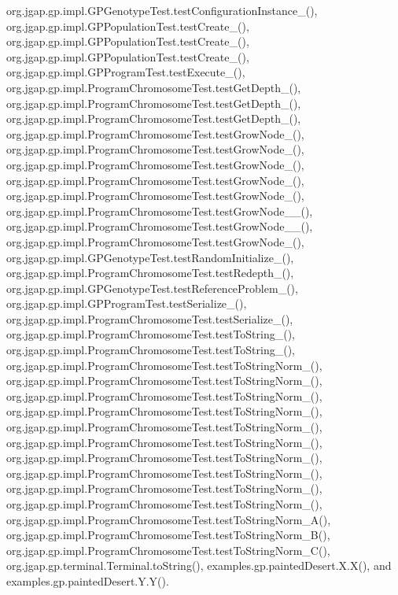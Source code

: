 org.\-jgap.\-gp.\-impl.\-G\-P\-Genotype\-Test.\-test\-Configuration\-Instance\-\_(), org.\-jgap.\-gp.\-impl.\-G\-P\-Population\-Test.\-test\-Create\-\_(), org.\-jgap.\-gp.\-impl.\-G\-P\-Population\-Test.\-test\-Create\-\_(), org.\-jgap.\-gp.\-impl.\-G\-P\-Population\-Test.\-test\-Create\-\_(), org.\-jgap.\-gp.\-impl.\-G\-P\-Program\-Test.\-test\-Execute\-\_(), org.\-jgap.\-gp.\-impl.\-Program\-Chromosome\-Test.\-test\-Get\-Depth\-\_(), org.\-jgap.\-gp.\-impl.\-Program\-Chromosome\-Test.\-test\-Get\-Depth\-\_(), org.\-jgap.\-gp.\-impl.\-Program\-Chromosome\-Test.\-test\-Get\-Depth\-\_(), org.\-jgap.\-gp.\-impl.\-Program\-Chromosome\-Test.\-test\-Grow\-Node\-\_(), org.\-jgap.\-gp.\-impl.\-Program\-Chromosome\-Test.\-test\-Grow\-Node\-\_(), org.\-jgap.\-gp.\-impl.\-Program\-Chromosome\-Test.\-test\-Grow\-Node\-\_(), org.\-jgap.\-gp.\-impl.\-Program\-Chromosome\-Test.\-test\-Grow\-Node\-\_(), org.\-jgap.\-gp.\-impl.\-Program\-Chromosome\-Test.\-test\-Grow\-Node\-\_(), org.\-jgap.\-gp.\-impl.\-Program\-Chromosome\-Test.\-test\-Grow\-Node\-\_\-\_(), org.\-jgap.\-gp.\-impl.\-Program\-Chromosome\-Test.\-test\-Grow\-Node\-\_\-\_(), org.\-jgap.\-gp.\-impl.\-Program\-Chromosome\-Test.\-test\-Grow\-Node\-\_(), org.\-jgap.\-gp.\-impl.\-G\-P\-Genotype\-Test.\-test\-Random\-Initialize\-\_(), org.\-jgap.\-gp.\-impl.\-Program\-Chromosome\-Test.\-test\-Redepth\-\_(), org.\-jgap.\-gp.\-impl.\-G\-P\-Genotype\-Test.\-test\-Reference\-Problem\-\_(), org.\-jgap.\-gp.\-impl.\-G\-P\-Program\-Test.\-test\-Serialize\-\_(), org.\-jgap.\-gp.\-impl.\-Program\-Chromosome\-Test.\-test\-Serialize\-\_(), org.\-jgap.\-gp.\-impl.\-Program\-Chromosome\-Test.\-test\-To\-String\-\_(), org.\-jgap.\-gp.\-impl.\-Program\-Chromosome\-Test.\-test\-To\-String\-\_(), org.\-jgap.\-gp.\-impl.\-Program\-Chromosome\-Test.\-test\-To\-String\-Norm\-\_(), org.\-jgap.\-gp.\-impl.\-Program\-Chromosome\-Test.\-test\-To\-String\-Norm\-\_(), org.\-jgap.\-gp.\-impl.\-Program\-Chromosome\-Test.\-test\-To\-String\-Norm\-\_(), org.\-jgap.\-gp.\-impl.\-Program\-Chromosome\-Test.\-test\-To\-String\-Norm\-\_(), org.\-jgap.\-gp.\-impl.\-Program\-Chromosome\-Test.\-test\-To\-String\-Norm\-\_(), org.\-jgap.\-gp.\-impl.\-Program\-Chromosome\-Test.\-test\-To\-String\-Norm\-\_(), org.\-jgap.\-gp.\-impl.\-Program\-Chromosome\-Test.\-test\-To\-String\-Norm\-\_(), org.\-jgap.\-gp.\-impl.\-Program\-Chromosome\-Test.\-test\-To\-String\-Norm\-\_(), org.\-jgap.\-gp.\-impl.\-Program\-Chromosome\-Test.\-test\-To\-String\-Norm\-\_(), org.\-jgap.\-gp.\-impl.\-Program\-Chromosome\-Test.\-test\-To\-String\-Norm\-\_(), org.\-jgap.\-gp.\-impl.\-Program\-Chromosome\-Test.\-test\-To\-String\-Norm\-\_\-\-A(), org.\-jgap.\-gp.\-impl.\-Program\-Chromosome\-Test.\-test\-To\-String\-Norm\-\_\-\-B(), org.\-jgap.\-gp.\-impl.\-Program\-Chromosome\-Test.\-test\-To\-String\-Norm\-\_\-\-C(), org.\-jgap.\-gp.\-terminal.\-Terminal.\-to\-String(), examples.\-gp.\-painted\-Desert.\-X.\-X(), and examples.\-gp.\-painted\-Desert.\-Y.\-Y().

